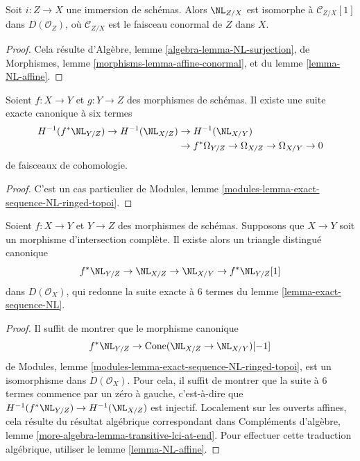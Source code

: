 \begin{lemma}
\label{lemma-NL-immersion}
Soit $i : Z \to X$ une immersion de schémas. Alors $\NL_{Z/X}$
est isomorphe à $\mathcal{C}_{Z/X}[1]$ dans $D(\mathcal{O}_Z)$,
où $\mathcal{C}_{Z/X}$ est le faisceau conormal de $Z$ dans $X$.
\end{lemma}

\begin{proof}
Cela résulte d'Algèbre, lemme \ref{algebra-lemma-NL-surjection},
de Morphismes, lemme \ref{morphisms-lemma-affine-conormal}, et
du lemme \ref{lemma-NL-affine}.
\end{proof}

\begin{lemma}
\label{lemma-exact-sequence-NL}
Soient $f : X \to Y$ et $g : Y \to Z$ des morphismes de schémas.
Il existe une suite exacte canonique à six termes
$$
\begin{aligned}
H^{-1}(f^*\NL_{Y/Z}) \to H^{-1}(\NL_{X/Z}) &\to H^{-1}(\NL_{X/Y}) \\
&\to f^*\Omega_{Y/Z} \to \Omega_{X/Z} \to \Omega_{X/Y} \to 0
\end{aligned}
$$
de faisceaux de cohomologie.
\end{lemma}

\begin{proof}
C'est un cas particulier de
Modules, lemme \ref{modules-lemma-exact-sequence-NL-ringed-topoi}.
\end{proof}

\begin{lemma}
\label{lemma-get-triangle-NL}
Soient $f : X \to Y$ et $Y \to Z$ des morphismes de schémas. Supposons que
$X \to Y$ soit un morphisme d'intersection complète. Il existe alors
un triangle distingué canonique
$$
f^*\NL_{Y/Z} \to \NL_{X/Z} \to \NL_{X/Y} \to f^*\NL_{Y/Z}[1]
$$
dans $D(\mathcal{O}_X)$, qui redonne la suite exacte à $6$ termes du
lemme \ref{lemma-exact-sequence-NL}.
\end{lemma}

\begin{proof}
Il suffit de montrer que le morphisme canonique
$$
f^*\NL_{Y/Z} \to \text{Cone}(\NL_{X/Z} \to \NL_{X/Y})[-1]
$$
de Modules, lemme \ref{modules-lemma-exact-sequence-NL-ringed-topoi},
est un isomorphisme dans $D(\mathcal{O}_X)$. Pour cela,
il suffit de montrer que la suite à $6$ termes commence par
un zéro à gauche, c'est-à-dire que $H^{-1}(f^*\NL_{Y/Z}) \to H^{-1}(\NL_{X/Z})$
est injectif. Localement sur les ouverts affines, cela résulte du
résultat algébrique correspondant dans Compléments d'algèbre, lemme
\ref{more-algebra-lemma-transitive-lci-at-end}.
Pour effectuer cette traduction algébrique, utiliser le lemme \ref{lemma-NL-affine}.
\end{proof}

